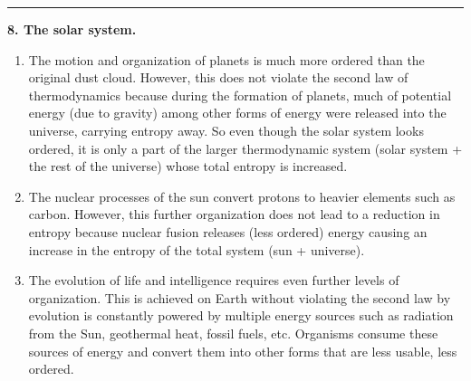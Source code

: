 \documentclass{article}
\theoremstyle{definition}
\begin{document}
\hrule

$\,$\\


\noindent \textbf{8. The solar system.}



\begin{enumerate}[label=(\alph*)]
	\item The motion and organization of planets is much more ordered than the original dust
	cloud. However, this does not violate the second law of thermodynamics because during the formation of planets, much of potential energy (due to gravity) among other forms of energy were released into the universe, carrying entropy away. So even though the solar system looks ordered, it is only a part of the larger thermodynamic system (solar system + the rest of the universe) whose total entropy is increased. 
	
	\item The nuclear processes of the sun convert protons to heavier elements such as carbon. However, this further organization does not lead to a reduction in entropy because nuclear fusion releases (less ordered) energy causing an increase in the entropy of the total system (sun + universe). 
	
	
	\item The evolution of life and intelligence requires even further levels of organization. This is achieved on Earth without violating the second law by evolution is constantly powered by multiple energy sources such as radiation from the Sun, geothermal heat, fossil fuels, etc. Organisms consume these sources of energy and convert them into other forms that are less usable, less ordered. 
\end{enumerate}
\end{document}
